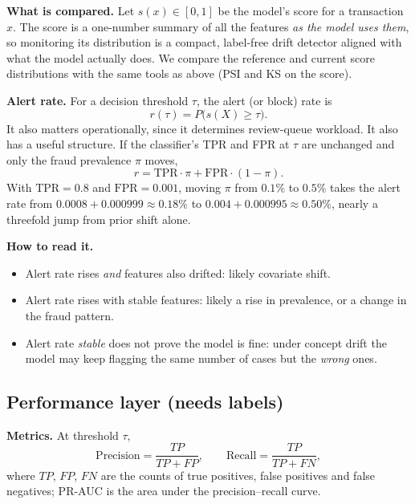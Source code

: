 \documentclass[11pt]{article}
\begin{document}
\textbf{What is compared.} Let \(s(x)\in[0,1]\) be the model's score for a transaction \(x\). The score is a one-number summary of all the features \emph{as the model uses them}, so monitoring its distribution is a compact, label-free drift detector aligned with what the model actually does. We compare the reference and current score distributions with the same tools as above (PSI and KS on the score).

\textbf{Alert rate.} For a decision threshold \(\tau\), the alert (or block) rate is
\[
r(\tau)=P\big(s(X)\ge\tau\big).
\]
It also matters operationally, since it determines review-queue workload. It also has a useful structure. If the classifier's TPR and FPR at \(\tau\) are unchanged and only the fraud prevalence \(\pi\) moves,
\[
r=\text{TPR}\cdot\pi+\text{FPR}\cdot(1-\pi).
\]
With \(\text{TPR}=0.8\) and \(\text{FPR}=0.001\), moving \(\pi\) from \(0.1\%\) to \(0.5\%\) takes the alert rate from \(0.0008+0.000999\approx0.18\%\) to \(0.004+0.000995\approx0.50\%\), nearly a threefold jump from prior shift alone.

\textbf{How to read it.}
\begin{itemize}
    \item Alert rate rises \emph{and} features also drifted: likely covariate shift.
    \item Alert rate rises with stable features: likely a rise in prevalence, or a change in the fraud pattern.
    \item Alert rate \emph{stable} does not prove the model is fine: under concept drift the model may keep flagging the same number of cases but the \emph{wrong} ones.
\end{itemize}

\subsection{Performance layer (needs labels)}

\textbf{Metrics.} At threshold \(\tau\),
\[
\text{Precision}=\frac{TP}{TP+FP},\qquad\text{Recall}=\frac{TP}{TP+FN},
\]
where \(TP\), \(FP\), \(FN\) are the counts of true positives, false positives and false negatives; PR-AUC is the area under the precision--recall curve.
\end{document}
